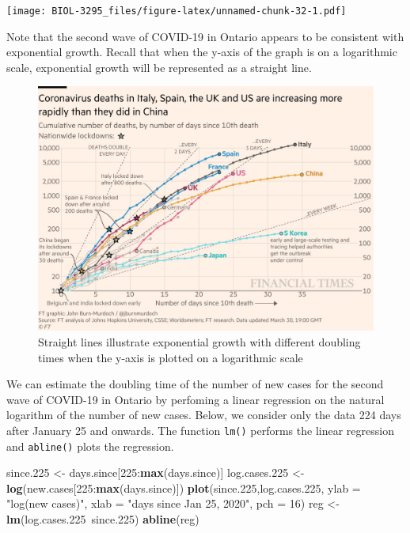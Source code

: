 \documentclass[]{book}
\newenvironment{Shaded}{\begin{snugshade}}{\end{snugshade}}
\newcommand{\KeywordTok}[1]{\textcolor[rgb]{0.13,0.29,0.53}{\textbf{{#1}}}}
\newcommand{\DataTypeTok}[1]{\textcolor[rgb]{0.13,0.29,0.53}{{#1}}}
\newcommand{\DecValTok}[1]{\textcolor[rgb]{0.00,0.00,0.81}{{#1}}}
\newcommand{\FloatTok}[1]{\textcolor[rgb]{0.00,0.00,0.81}{{#1}}}
\newcommand{\StringTok}[1]{\textcolor[rgb]{0.31,0.60,0.02}{{#1}}}
\newcommand{\NormalTok}[1]{{#1}}
\begin{document}
\texttt{[image: BIOL-3295\_files/figure-latex/unnamed-chunk-32-1.pdf]}

Note that the second wave of COVID-19 in Ontario appears to be
consistent with exponential growth. Recall that when the y-axis of the
graph is on a logarithmic scale, exponential growth will be represented
as a straight line.

\begin{figure}
\includegraphics[width=0.95\linewidth]{figures/doublingtime} \caption{Straight lines illustrate exponential growth with different doubling times when the y-axis is plotted on a logarithmic scale}\label{fig:doublingtime2}
\end{figure}

We can estimate the doubling time of the number of new cases for the
second wave of COVID-19 in Ontario by perfoming a linear regression on
the natural logarithm of the number of new cases. Below, we consider
only the data 224 days after January 25 and onwards. The function
\texttt{lm()} performs the linear regression and \texttt{abline()} plots
the regression.

\begin{Shaded}
\begin{Highlighting}[]
\NormalTok{since}\FloatTok{.225} \NormalTok{<-}\StringTok{ }\NormalTok{days.since[}\DecValTok{225}\NormalTok{:}\KeywordTok{max}\NormalTok{(days.since)]}
\NormalTok{log.cases}\FloatTok{.225} \NormalTok{<-}\StringTok{ }\KeywordTok{log}\NormalTok{(new.cases[}\DecValTok{225}\NormalTok{:}\KeywordTok{max}\NormalTok{(days.since)])}
\KeywordTok{plot}\NormalTok{(since}\FloatTok{.225}\NormalTok{,log.cases}\FloatTok{.225}\NormalTok{, }\DataTypeTok{ylab =} \StringTok{"log(new cases)"}\NormalTok{, }\DataTypeTok{xlab =} \StringTok{"days since Jan 25, 2020"}\NormalTok{, }\DataTypeTok{pch =} \DecValTok{16}\NormalTok{)}
\NormalTok{reg <-}\StringTok{ }\KeywordTok{lm}\NormalTok{(log.cases}\FloatTok{.225}\NormalTok{~since}\FloatTok{.225}\NormalTok{)}
\KeywordTok{abline}\NormalTok{(reg)}
\end{Highlighting}
\end{Shaded}
\end{document}
